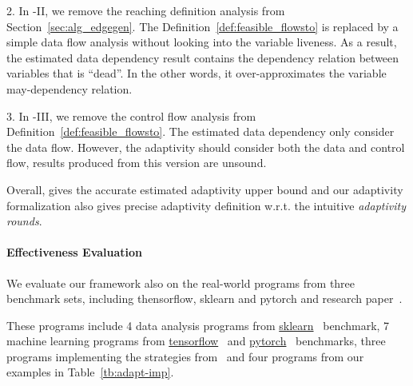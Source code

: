 2. In {\THESYSTEM}-II, we remove the reaching definition analysis from Section~\ref{sec:alg_edgegen}.
The Definition~\ref{def:feasible_flowsto} is replaced by a simple data flow analysis without looking into the variable liveness.
As a result, the estimated data dependency result contains the dependency relation between variables that is ``dead''. In the other words, it over-approximates the variable may-dependency relation.

3. In {\THESYSTEM}-III, we remove the control flow analysis from Definition~\ref{def:feasible_flowsto}.
The estimated data dependency only consider the data flow.
However, the adaptivity should consider both the data and control flow, results produced from this version are unsound.

Overall, {\THESYSTEM} gives the accurate estimated
adaptivity upper bound and our adaptivity formalization also gives precise adaptivity definition w.r.t. the intuitive \emph{adaptivity rounds}.



\paragraph{Effectiveness Evaluation}
We evaluate our framework also on the real-world programs from
three benchmark sets, including thensorflow, sklearn and pytorch and research paper~\cite{Jamieson2015TheAO}.

These programs include  
4 data analysis programs 
from \hyperlink{https://github.com/scikit-learn/scikit-learn/tree/main/examples}{sklearn}~\cite{SklearnBenchmark} benchmark,
7 machine learning programs
from \hyperlink{https://github.com/tensorflow/tensorflow/tree/master/tensorflow/examples}{tensorflow}~\cite{TensorflowBenchmark}
and \hyperlink{https://github.com/pytorch/pytorch}{pytorch}~\cite{PytorchBenchmark}
benchmarks,
{three programs implementing the strategies from~\cite{Jamieson2015TheAO}}
and four programs from our examples in Table~\ref{tb:adapt-imp}.


